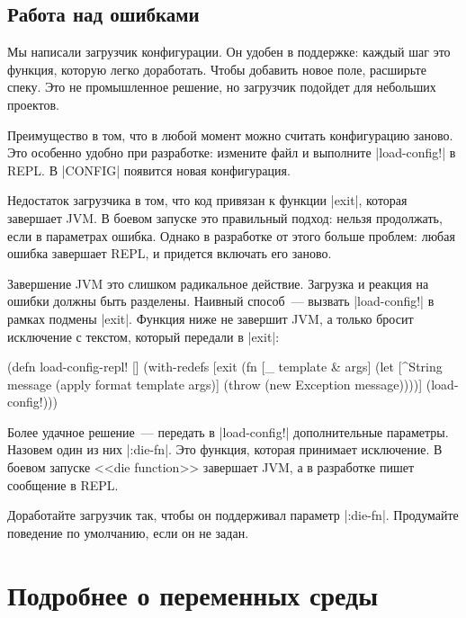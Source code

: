 \subsection{Работа над ошибками}

Мы написали загрузчик конфигурации. Он удобен в поддержке: каждый шаг это
функция, которую легко доработать. Чтобы добавить новое поле, расширьте
спеку. Это не промышленное решение, но загрузчик подойдет для небольших
проектов.

Преимущество в том, что в любой момент можно считать конфигурацию заново. Это
особенно удобно при разработке: измените файл и выполните \spverb|load-config!|
в REPL. В \spverb|CONFIG| появится новая конфигурация.

Недостаток загрузчика в том, что код привязан к функции \spverb|exit|, которая
завершает JVM. В боевом запуске это правильный подход: нельзя продолжать, если в
параметрах ошибка. Однако в разработке от этого больше проблем: любая ошибка
завершает REPL, и придется включать его заново.

Завершение JVM это слишком радикальное действие. Загрузка и реакция на ошибки
должны быть разделены. Наивный способ~--- вызвать \spverb|load-config!| в рамках
подмены \spverb|exit|. Функция ниже не завершит JVM, а только бросит исключение
с текстом, который передали в \spverb|exit|:

\begin{english}
  \begin{clojure}
(defn load-config-repl! []
  (with-redefs
    [exit (fn [_ template & args]
            (let [^String message
                  (apply format template args)]
              (throw (new Exception message))))]
    (load-config!)))
  \end{clojure}
\end{english}

Более удачное решение~--- передать в \spverb|load-config!| дополнительные
параметры. Назовем один из них \spverb|:die-fn|. Это функция, которая принимает
исключение. В боевом запуске <<die function>> завершает JVM, а в разработке
пишет сообщение в REPL.

Доработайте загрузчик так, чтобы он поддерживал параметр
\spverb|:die-fn|. Продумайте поведение по умолчанию, если он не задан.

\section{Подробнее о переменных среды}

